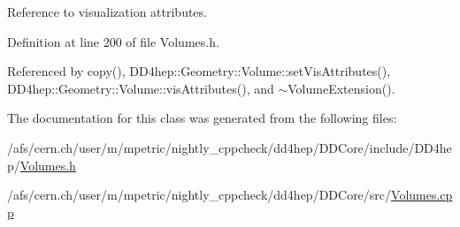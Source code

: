 Reference to visualization attributes. 

Definition at line 200 of file Volumes.h.

Referenced by copy(), DD4hep::Geometry::Volume::setVisAttributes(), DD4hep::Geometry::Volume::visAttributes(), and $\sim$VolumeExtension().

The documentation for this class was generated from the following files:\begin{DoxyCompactItemize}
\item 
/afs/cern.ch/user/m/mpetric/nightly\_\-cppcheck/dd4hep/DDCore/include/DD4hep/\hyperlink{_volumes_8h}{Volumes.h}\item 
/afs/cern.ch/user/m/mpetric/nightly\_\-cppcheck/dd4hep/DDCore/src/\hyperlink{_volumes_8cpp}{Volumes.cpp}\end{DoxyCompactItemize}
